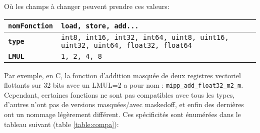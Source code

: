 Où les champs à changer peuvent prendre ces valeurs:

\begin{center}
\begin{tabular}{|l|p{8cm}|} 
   \hline \texttt{\textbf{\color{orange}nomFonction}} & \texttt{load, store, add...}\\
   \hline \texttt{\textbf{\color{blue}type}} & \texttt{int8, int16, int32, int64, uint8, uint16, uint32, uint64, float32, float64}\\
   \hline \texttt{\textbf{\color{purple}LMUL}} & \texttt{1, 2, 4, 8}\\
   \hline
\end{tabular}
\end{center}

Par exemple, en C, la fonction d'addition masquée de deux registres vectoriel flottants sur 32 bits avec un LMUL=2 a pour nom : \texttt{mipp\_add\_float32\_m2\_m}.\\

Cependant, certaines fonctions ne sont pas compatibles avec tous les types, d'autres n'ont pas de versions masquées/avec maskedoff, et enfin des dernières ont un nommage légèrement différent. Ces spécificités sont énumérées dans le tableau suivant (table \ref{table:compa}):

\newcommand\colTabCompa[4]{\hline \textbf{\texttt{#1}} & #2 & \texttt{#3} & \texttt{#4}\\}

